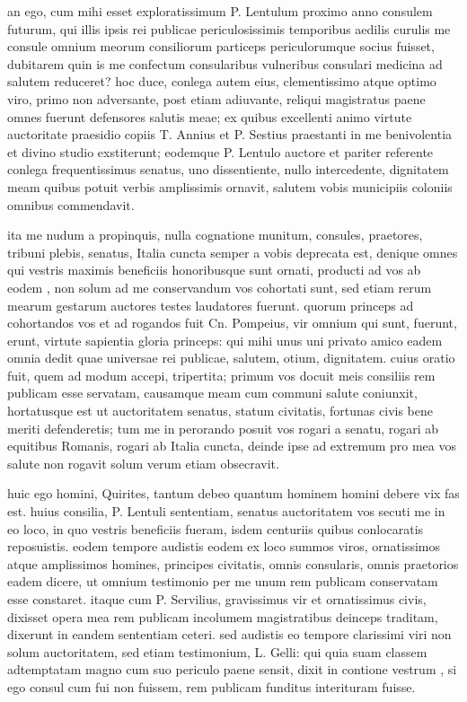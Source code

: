 an ego, cum mihi esset exploratissimum P. Lentulum proximo anno consulem futurum, qui illis ipsis rei publicae periculosissimis temporibus aedilis curulis me consule omnium meorum consiliorum particeps periculorumque socius fuisset, dubitarem quin is me confectum consularibus vulneribus consulari medicina ad salutem reduceret? hoc duce, conlega autem eius, clementissimo atque optimo viro, primo non adversante, post etiam adiuvante, reliqui magistratus paene omnes fuerunt defensores salutis meae; ex quibus excellenti animo virtute auctoritate praesidio copiis T. Annius et P. Sestius praestanti in me benivolentia et divino studio exstiterunt; eodemque P. Lentulo auctore et pariter referente conlega frequentissimus senatus, uno dissentiente, nullo intercedente, dignitatem meam quibus potuit verbis amplissimis ornavit, salutem vobis municipiis coloniis omnibus commendavit.

 ita me nudum a propinquis, nulla cognatione munitum, consules, praetores, tribuni plebis, senatus, Italia cuncta semper a vobis deprecata est, denique omnes qui vestris maximis beneficiis honoribusque sunt ornati, producti ad vos ab eodem , non solum ad me conservandum vos cohortati sunt, sed etiam rerum mearum gestarum auctores testes laudatores fuerunt. quorum princeps ad cohortandos vos et ad rogandos fuit Cn. Pompeius, vir omnium qui sunt, fuerunt, erunt, virtute sapientia gloria princeps: qui mihi unus uni privato amico eadem omnia dedit quae universae rei publicae, salutem, otium, dignitatem. cuius oratio fuit, quem ad modum accepi, tripertita; primum vos docuit meis consiliis rem publicam esse servatam, causamque meam cum communi salute coniunxit, hortatusque est ut auctoritatem senatus, statum civitatis, fortunas civis bene meriti defenderetis; tum me in perorando posuit vos rogari a senatu, rogari ab equitibus Romanis, rogari ab Italia cuncta, deinde ipse ad extremum pro mea vos salute non rogavit solum verum etiam obsecravit.

 huic ego homini, Quirites, tantum debeo quantum hominem homini debere vix fas est. huius consilia, P. Lentuli sententiam, senatus auctoritatem vos secuti me in eo loco, in quo vestris beneficiis fueram, isdem centuriis quibus conlocaratis reposuistis. eodem tempore audistis eodem ex loco summos viros, ornatissimos atque amplissimos homines, principes civitatis, omnis consularis, omnis praetorios eadem dicere, ut omnium testimonio per me unum rem publicam conservatam esse constaret. itaque cum P. Servilius, gravissimus vir et ornatissimus civis, dixisset opera mea rem publicam incolumem magistratibus deinceps traditam, dixerunt in eandem sententiam ceteri. sed audistis eo tempore clarissimi viri non solum auctoritatem, sed etiam testimonium, L. Gelli: qui quia suam classem adtemptatam magno cum suo periculo paene sensit, dixit in contione vestrum , si ego consul cum fui non fuissem, rem publicam funditus interituram fuisse.

